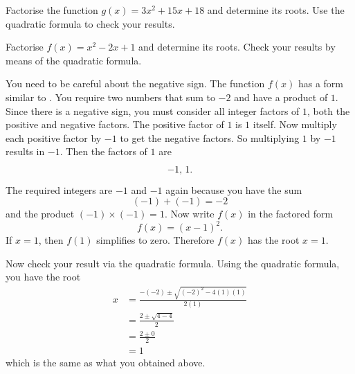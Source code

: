 \documentclass[a4paper,oneside,12pt]{article}
\begin{document}
\begin{exercise}
Factorise the function $g(x) = 3x^2 + 15x + 18$ and determine its
roots.  Use the quadratic formula to check your results.
\end{exercise}


\begin{example}
\label{eg:quadroots:factored_form_bminus2_c1}
Factorise $f(x) = x^2 - 2x + 1$ and determine its roots.  Check your
results by means of the quadratic formula.
\end{example}

\begin{solution}
You need to be careful about the negative sign.  The function $f(x)$
has a form similar to
.  You require two
numbers that sum to $-2$ and have a product of $1$.  Since there is a
negative sign, you must consider all integer factors of $1$, both the
positive and negative factors.  The positive factor of $1$ is $1$
itself.  Now multiply each positive factor by $-1$ to get the negative
factors.  So multiplying $1$ by $-1$ results in $-1$.  Then the
factors of $1$ are
\[
{-1},\, {1}.
\]
The required integers are $-1$ and $-1$ again because you have the sum
\[
(-1) + (-1)
=
-2
\]
and the product $(-1) \times (-1) = 1$.  Now write $f(x)$ in the
factored form
\[
f(x)
=
(x - 1)^2.
\]
If $x = 1$, then $f(1)$ simplifies to zero.  Therefore $f(x)$ has the
root $x = 1$.

Now check your result via the quadratic formula.  Using the quadratic
formula, you have the root
\begin{align*}
x
&=
\frac{
  -(-2)
  \pm
  \sqrt{(-2)^2 - 4(1)(1)}
}{
  2(1)
} \\[4pt]
&=
\frac{
  2
  \pm
  \sqrt{4 - 4}
}{
  2
} \\[4pt]
&=
\frac{
  2 \pm 0
}{
  2
} \\[4pt]
&=
1
\end{align*}
which is the same as what you obtained above.
\end{solution}
\end{document}
